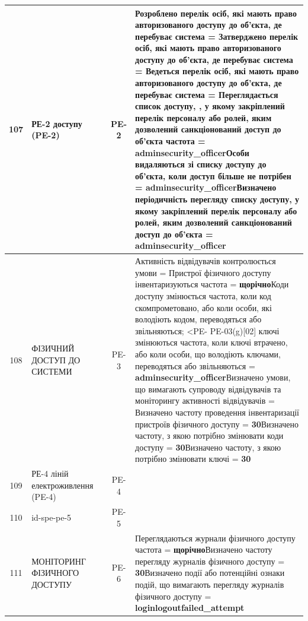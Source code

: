 \documentclass[10pt]{article}
\begin{document}
\begin{longtable}{|c|>{\raggedright\arraybackslash}p{2.5cm}|>{\raggedright\arraybackslash}p{4.5cm}|c|>{\raggedright\arraybackslash}p{4.5cm}|}
107 & РЕ-2 доступу (PE-2) &  & PE-2 & Розроблено перелік осіб, які мають право авторизованого доступу до об'єкта, де перебуває система = \textbf{}\newline Затверджено перелік осіб, які мають право авторизованого доступу до об'єкта, де перебуває система = \textbf{}\newline Ведеться перелік осіб, які мають право авторизованого доступу до об'єкта, де перебуває система = \textbf{}\newline Переглядається список доступу, , у якому закріплений перелік персоналу або ролей, яким дозволений санкціонований доступ до об'єкта частота = \textbf{adminsecurity\_\allowbreak{}officer}\newline Особи видаляються зі списку доступу до об'єкта, коли доступ більше не потрібен = \textbf{adminsecurity\_\allowbreak{}officer}\newline Визначено періодичність перегляду списку доступу, у якому закріплений перелік персоналу або ролей, яким дозволений санкціонований доступ до об'єкта = \textbf{adminsecurity\_\allowbreak{}officer} \\ \hline
108 & ФІЗИЧНИЙ ДОСТУП ДО СИСТЕМИ &  & PE-3 & Активність відвідувачів контролюється умови = \textbf{}\newline Пристрої фізичного доступу інвентаризуються частота = \textbf{щорічно}\newline Коди доступу змінюється частота, коли код скомпрометовано, або коли особи, які володіють кодом, переводяться або звільняються; <PE- PE-03(g)[02] ключі змінюються частота, коли ключі втрачено, або коли особи, що володіють ключами, переводяться або звільняються = \textbf{adminsecurity\_\allowbreak{}officer}\newline Визначено умови, що вимагають супроводу відвідувачів та моніторингу активності відвідувачів = \textbf{}\newline Визначено частоту проведення інвентаризації пристроїв фізичного доступу = \textbf{30}\newline Визначено частоту, з якою потрібно змінювати коди доступу = \textbf{30}\newline Визначено частоту, з якою потрібно змінювати ключі = \textbf{30} \\ \hline
109 & РЕ-4 ліній електроживлення (PE-4) &  & PE-4 &  \\ \hline
110 & id-spe-pe-5 &  & PE-5 &  \\ \hline
111 & МОНІТОРИНГ ФІЗИЧНОГО ДОСТУПУ &  & PE-6 & Переглядаються журнали фізичного доступу частота = \textbf{щорічно}\newline Визначено частоту перегляду журналів фізичного доступу = \textbf{30}\newline Визначено події або потенційні ознаки подій, що вимагають перегляду журналів фізичного доступу = \textbf{loginlogoutfailed\_\allowbreak{}attempt} \\ \hline

\end{longtable}
\end{document}
